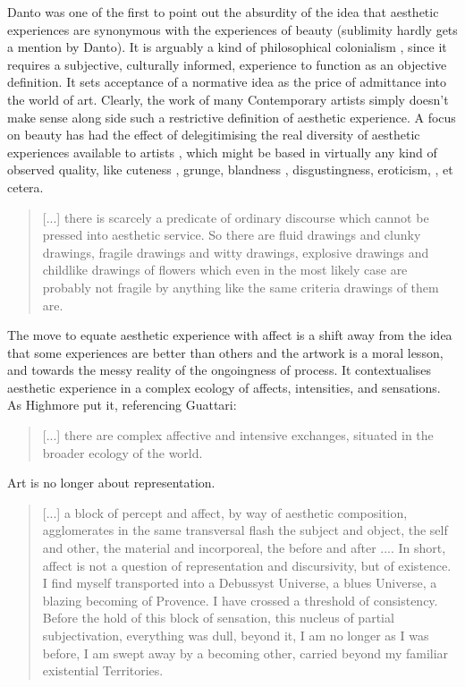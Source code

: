         Danto was one of the first to point out the absurdity of the idea that aesthetic experiences are synonymous with the experiences of beauty (sublimity hardly gets a mention by Danto). It is arguably a kind of philosophical colonialism \citep[p.124]{DantoEmbdMnngs2007}, since it requires a subjective, culturally informed, experience to function as an objective definition. It sets acceptance of a normative idea as the price of admittance into the world of art. Clearly, the work of many Contemporary artists simply doesn't make sense along side such a restrictive definition of aesthetic experience. A focus on beauty has had the effect of delegitimising the real diversity of aesthetic experiences available to artists \citep[p.59]{DantoThAbsOfBty2003}, which might be based in virtually any kind of observed quality, like cuteness \citep[p.28]{DantoThPhlsphclArt2005}, grunge, blandness \citep[p.126]{DantoEmbdMnngs2007}, disgustingness, eroticism, \citep[p.59]{DantoThAbsOfBty2003}, et cetera.

        \begin{quote}
            [...] there is scarcely a predicate of ordinary discourse which cannot be pressed into aesthetic service. So there are fluid drawings and clunky drawings, fragile drawings and witty drawings, explosive drawings and childlike drawings of flowers which even in the most likely case are probably not fragile by anything like the same criteria drawings of them are. \citep[pp. 28-29]{DantoThPhlsphclArt2005}
        \end{quote}

        The move to equate aesthetic experience with affect is a shift away from the idea that some experiences are better than others and the artwork is a moral lesson, and towards the messy reality of the ongoingness of process. It contextualises aesthetic experience in a complex ecology of affects, intensities, and sensations. As Highmore put it, referencing Guattari:

        \begin{quote}
            [...] there are complex affective and intensive exchanges, situated in the broader ecology of the world. \citep[p.155]{HighmoreBttrAftrTst2010}
        \end{quote}

        Art is no longer about representation.

		\begin{quote}
		    [...] a block of percept and affect, by way of aesthetic composition, agglomerates in the same transversal flash the subject and object, the self and other, the material and incorporeal, the before and after .... In short, affect is not a question of representation and discursivity, but of existence. I find myself transported into a Debussyst Universe, a blues Universe, a blazing becoming of Provence. I have crossed a threshold of consistency. Before the hold of this block of sensation, this nucleus of partial subjectivation, everything was dull, beyond it, I am no longer as I was before, I am swept away by a becoming other, carried beyond my familiar existential Territories.
		\citep[p.93]{GuattariChsmss1995}
		\end{quote}

